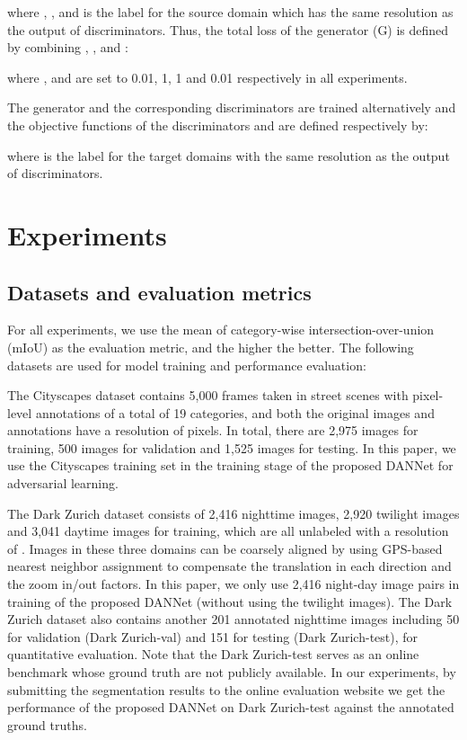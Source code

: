 \documentclass[final]{cvpr}
\begin{document}
where , , and  is the label for the source domain which has the same resolution as the output of discriminators.  
Thus, the total loss  of the generator (G) is defined by combining , ,  and :

where , and  are set to 0.01, 1, 1 and 0.01 respectively in all experiments.

The generator and the corresponding discriminators are trained alternatively and the objective functions of the discriminators  and  are defined respectively by:

\vspace{-0.2cm}

where  is the label for the target domains with the same resolution as the output of discriminators.



\section{Experiments}

\subsection{Datasets and evaluation metrics}

For all experiments, we use the mean of category-wise intersection-over-union (mIoU) as the evaluation metric, and the higher the better.
The following datasets are used for model training and performance evaluation:

\vspace{0.1cm}
 \cite{cordts2016cityscapes}\hspace{0.2cm}
The Cityscapes dataset contains 5,000 frames taken in street scenes with pixel-level annotations of a total of 19 categories, and both the original images and annotations have a resolution of 
 pixels. 
In total, there are 2,975 images for training, 500 images for validation and 1,525 images for testing. In this paper,
we use the Cityscapes training set in the training stage of the proposed DANNet for adversarial learning.

\vspace{0.1cm}
 \cite{sakaridis2019guided}\hspace{0.2cm}
The Dark Zurich dataset consists of 2,416 nighttime images, 2,920 twilight images and 3,041 daytime images for training, which are all unlabeled with a resolution of . 
Images in these three domains can be coarsely aligned by using GPS-based nearest neighbor assignment to compensate the translation in each direction and the zoom in/out factors. 
In this paper, we only use 2,416 night-day image pairs in training of the proposed DANNet (without using the twilight images). 
The Dark Zurich dataset also contains another 201 annotated nighttime images including 50 for validation (Dark Zurich-val) and 151 for testing (Dark Zurich-test), for quantitative evaluation.
Note that the Dark Zurich-test serves as an online benchmark whose ground truth are not publicly available.
In our experiments, by submitting the segmentation results to the online evaluation website we get the performance of the proposed DANNet on Dark Zurich-test against the annotated ground truths. 
\end{document}
